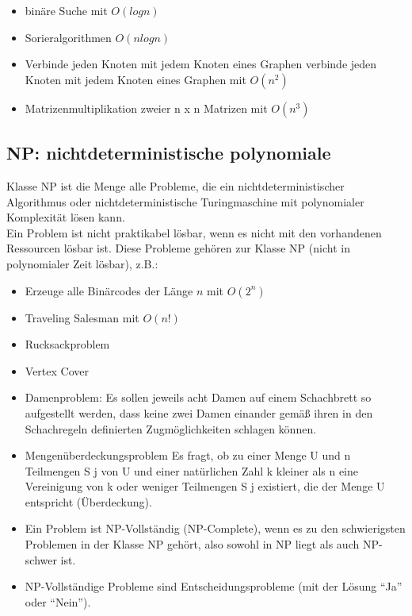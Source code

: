 \documentclass{article}
\begin{document}
\begin{multicols}{2}
\begin{itemize}
    \item binäre Suche mit $ O(log n) $
    \item Sorieralgorithmen $ O(n log n) $
    \item Verbinde jeden Knoten mit jedem Knoten eines Graphen verbinde jeden Knoten mit jedem Knoten eines Graphen mit $ O(n^2) $
    \item Matrizenmultiplikation zweier n x n Matrizen mit $ O(n^3) $
\end{itemize}

\subsection{NP: nichtdeterministische polynomiale}

Klasse NP ist die Menge alle Probleme, die ein nichtdeterministischer
Algorithmus oder nichtdeterministische Turingmaschine mit
polynomialer Komplexität lösen kann. \\

Ein Problem ist nicht praktikabel lösbar, wenn es nicht mit den
vorhandenen Ressourcen lösbar ist.
Diese Probleme gehören zur Klasse NP (nicht in polynomialer Zeit
lösbar), z.B.:



\begin{itemize}
    \item Erzeuge alle Binärcodes der Länge $ n $ mit $ O(2^n) $
    \item Traveling Salesman mit $ O(n!) $
    \item Rucksackproblem
    \item Vertex Cover
    \item Damenproblem: Es sollen jeweils acht Damen auf einem Schachbrett so aufgestellt
werden, dass keine zwei Damen einander gemäß ihren in den
Schachregeln definierten Zugmöglichkeiten schlagen können.
    \item Mengenüberdeckungsproblem
Es fragt, ob zu einer Menge U und n Teilmengen S j von U und einer
natürlichen Zahl k kleiner als n eine Vereinigung von k oder weniger
Teilmengen S j existiert, die der Menge U entspricht (Überdeckung).
    \item Ein Problem ist NP-Vollständig (NP-Complete), wenn es zu den
schwierigsten Problemen in der Klasse NP gehört, also sowohl in NP
liegt als auch NP-schwer ist.
    \item NP-Vollständige Probleme sind Entscheidungsprobleme (mit der
Lösung “Ja” oder “Nein”).
\end{itemize}



\end{multicols}
\end{document}

